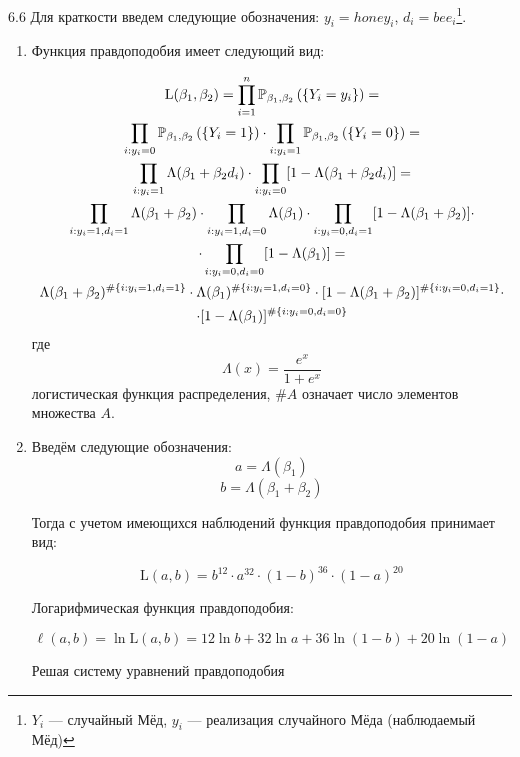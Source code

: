 \begin{solution}{{6.6}}
Для краткости введем следующие обозначения: $y_i = honey_i$, $d_i = bee_i$\footnote{$Y_i$ — случайный Мёд, $y_i$ — реализация случайного Мёда (наблюдаемый Мёд)}.

\begin{enumerate}
\item Функция правдоподобия имеет следующий вид:

\begin{multline*}
\text{L}(\beta_1, \beta_2) = \prod_{i=1}^n \P_{\beta_1, \beta_2} \left(\left\lbrace Y_i = y_i \right\rbrace \right) =\\
 \prod_{i: y_i = 0} \P_{\beta_1, \beta_2} \left(\left\lbrace Y_i = 1 \right\rbrace \right) \cdot \prod_{i: y_i = 1} \P_{\beta_1, \beta_2} \left(\left\lbrace Y_i = 0 \right\rbrace \right) =\\
\prod_{i: y_i = 1} \Lambda(\beta_1 + \beta_2 d_i) \cdot \prod_{i: y_i = 0} [1 - \Lambda(\beta_1 + \beta_2 d_i)] = \\
\prod_{i: y_i = 1, d_i = 1} \Lambda(\beta_1 + \beta_2) \cdot \prod_{i: y_i = 1, d_i = 0} \Lambda(\beta_1) \cdot \prod_{i: y_i = 0, d_i = 1} [1 - \Lambda(\beta_1 + \beta_2)] \cdot \\
\cdot \prod_{i: y_i = 0, d_i = 0} [1 - \Lambda(\beta_1)] = \\
\Lambda(\beta_1 + \beta_2)^{\#\{i: y_i=1, d_i=1\}} \cdot \Lambda(\beta_1)^{\#\{i: y_i=1, d_i=0\}} \cdot [1 - \Lambda(\beta_1 + \beta_2)]^{\#\{i: y_i=0, d_i=1\}} \cdot \\
\cdot  [1 - \Lambda(\beta_1)]^{\#\{i: y_i=0, d_i=0\}}
\end{multline*}
где
\[
\Lambda(x) = \frac{e^x}{1 + e^x}
\]
логистическая функция распределения, $\#A$ означает число элементов множества $A$.

\item Введём следующие обозначения:
\[
a = \Lambda(\beta_1)
\]
\[
b = \Lambda(\beta_1 + \beta_2)
\]



Тогда с учетом имеющихся наблюдений функция правдоподобия принимает вид:

\[
\text{L}(a, b) = b^{12} \cdot a^{32} \cdot (1 - b)^{36} \cdot (1 - a)^{20}
\]

Логарифмическая функция правдоподобия:

\[
\ell(a, b) = \ln \text{L}(a, b) = 12\ln b + 32\ln a + 36\ln(1-b) + 20\ln(1 - a)
\]

Решая систему уравнений правдоподобия


\end{enumerate}
\end{solution}
